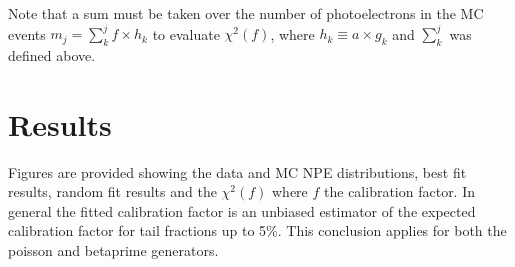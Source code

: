 \documentclass[12pt]{article}
\begin{document}
Note that a sum must be taken over the number of photoelectrons in the MC events  $m_j  = \sum_k^j f\times h_k$ to evaluate $\chi^2(f)$, 
where $h_k \equiv a\times g_k$ and $\sum_k^j$ was defined above.



\clearpage
\section{Results}
Figures are provided showing the data and MC NPE distributions, best fit results, random fit results and the $\chi^2(f)$ where $f$ the calibration factor.
In general the fitted calibration factor is an unbiased estimator of the expected calibration factor for tail fractions up to 5\%. 
This conclusion applies for both the poisson and betaprime generators.



\clearpage

\clearpage



\end{document}
